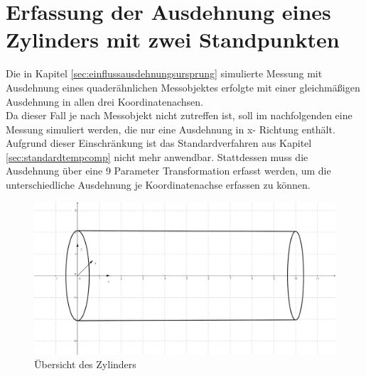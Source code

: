 \section{Erfassung der Ausdehnung eines Zylinders mit zwei Standpunkten}\label{sec:erfassungzylinder}

Die in Kapitel \ref{sec:einflussausdehnungsursprung} simulierte Messung mit Ausdehnung eines quaderähnlichen Messobjektes erfolgte mit einer gleichmäßigen Ausdehnung in allen drei Koordinatenachsen.\\ 
Da dieser Fall je nach Messobjekt nicht zutreffen ist, soll im nachfolgenden eine Messung simuliert werden, die nur eine Ausdehnung in x- Richtung enthält.\\
Aufgrund dieser Einschränkung ist das Standardverfahren aus Kapitel \ref{sec:standardtempcomp} nicht mehr anwendbar. Stattdessen muss die Ausdehnung über eine 9 Parameter Transformation erfasst werden, um die unterschiedliche Ausdehnung je Koordinatenachse erfassen zu können.

\begin{figure}[H]
\label{fig:zylinderuebersicht}
\centering
	\includegraphics[scale=1.0]{bilder/zylinder}
	\caption{Übersicht des Zylinders}
\end{figure}

